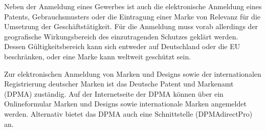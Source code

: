 Neben der Anmeldung eines Gewerbes ist auch die elektronische Anmeldung eines Patents, Gebrauchsmusters oder die Eintragung einer Marke von Relevanz für die Umsetzung der Geschäftstätigkeit. 
Für die Anmeldung muss vorab allerdings der geografische Wirkungsbereich des einzutragenden Schutzes geklärt werden. 
Dessen Gültigkeitsbereich kann sich entweder auf Deutschland oder die EU beschränken, oder eine Marke kann weltweit geschützt sein.

Zur elektronischen Anmeldung von Marken und Designs sowie der internationalen Registrierung deutscher Marken ist das Deutsche Patent und Markenamt (DPMA) zuständig. 
Auf der Internetseite der DPMA können über ein Onlineformular Marken und Designs sowie internationale Marken angemeldet werden. Alternativ bietet das DPMA auch eine Schnittstelle (DPMAdirectPro) an.